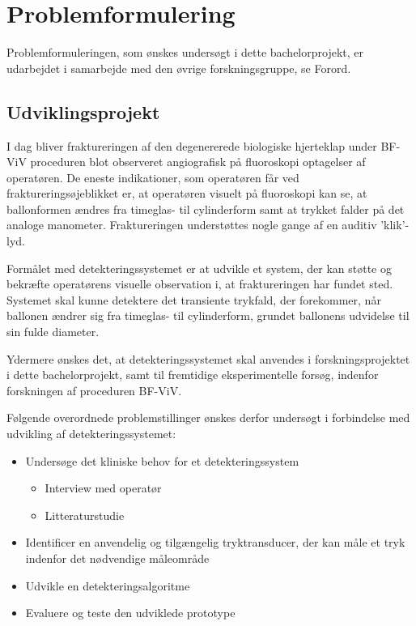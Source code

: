 \chapter{Problemformulering}
Problemformuleringen, som ønskes undersøgt i dette bachelorprojekt, er udarbejdet i samarbejde med den øvrige forskningsgruppe, se Forord.  

\section{Udviklingsprojekt}
I dag bliver fraktureringen af den degenererede biologiske hjerteklap under BF-ViV proceduren blot observeret angiografisk på fluoroskopi optagelser af operatøren. De eneste indikationer, som operatøren får ved fraktureringsøjeblikket er, at operatøren visuelt på fluoroskopi kan se, at ballonformen ændres fra timeglas- til cylinderform samt at trykket falder på det analoge manometer. Fraktureringen understøttes nogle gange af en auditiv 'klik'-lyd.

Formålet med detekteringssystemet er at udvikle et system, der kan støtte og bekræfte operatørens visuelle observation i, at fraktureringen har fundet sted. Systemet skal kunne detektere det transiente trykfald, der forekommer, når ballonen ændrer sig fra timeglas- til cylinderform, grundet ballonens udvidelse til sin fulde diameter. 

Ydermere ønskes det, at detekteringssystemet skal anvendes i forskningsprojektet i dette bachelorprojekt, samt til fremtidige eksperimentelle forsøg, indenfor forskningen af proceduren BF-ViV.     

Følgende overordnede problemstillinger ønskes derfor undersøgt i forbindelse med udvikling af detekteringssystemet:
\begin{itemize}
	\item Undersøge det kliniske behov for et detekteringssystem
	\begin{itemize}
		\item Interview med operatør 
		\item Litteraturstudie 
	\end{itemize}
	\item Identificer en anvendelig og tilgængelig tryktransducer, der kan måle et tryk indenfor det nødvendige måleområde
	\item Udvikle en detekteringsalgoritme
	\item Evaluere og teste den udviklede prototype	
\end{itemize}


